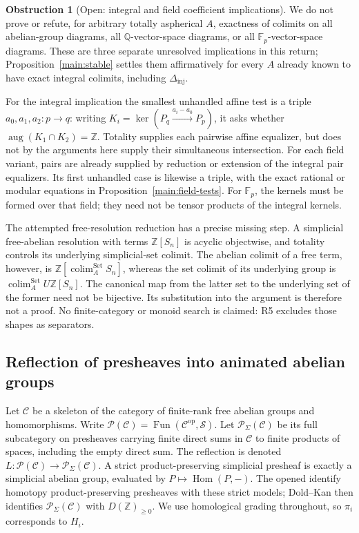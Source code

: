 \documentclass[11pt,a4paper]{article}
\theoremstyle{definition}
\newtheorem{obstruction}[theorem]{Obstruction}
\begin{document}
\begin{obstruction}[Open: integral and field coefficient implications]\label{main:stable-open}
We do not prove or refute, for arbitrary totally aspherical $A$, exactness
of colimits on all abelian-group diagrams, all $\mathbb Q$-vector-space
diagrams, or all $\mathbb F_p$-vector-space diagrams. These are three
separate unresolved implications in this return; Proposition~\ref{main:stable}
settles them affirmatively for every $A$ already known to have exact
integral colimits, including $\Delta_{\mathrm{inj}}$.

For the integral implication the smallest unhandled affine test is a
triple $a_0,a_1,a_2:p\to q$: writing
$K_i=\ker(P_q\xrightarrow{a_i-a_0}P_p)$, it asks whether
$\operatorname{aug}(K_1\cap K_2)=\mathbb Z$. Totality supplies each
pairwise affine equalizer, but does not by the arguments here supply their
simultaneous intersection. For each field variant, pairs are already supplied by reduction or extension of the integral pair equalizers. Its first unhandled case is likewise a triple, with the exact rational or modular equations in Proposition~\ref{main:field-tests}. For $\mathbb F_p$, the kernels must be formed over that field; they need not be tensor products of the integral kernels.

The attempted free-resolution reduction has a precise missing step.
A simplicial free-abelian resolution with terms $\mathbb Z[S_n]$ is
acyclic objectwise, and totality controls its underlying simplicial-set
colimit. The abelian colimit of a free term, however, is
$\mathbb Z[\operatorname{colim}^{\mathrm{Set}}_A S_n]$, whereas the set
colimit of its underlying group is
$\operatorname{colim}^{\mathrm{Set}}_A U\mathbb Z[S_n]$.
The canonical map from the latter set to the underlying set of the former
need not be bijective. Its substitution into the argument is therefore
not a proof. No finite-category or monoid search is claimed: R5 excludes
those shapes as separators.
\end{obstruction}

\subsection{Reflection of presheaves into animated abelian groups}

Let $\mathcal C$ be a skeleton of the category of finite-rank free abelian
groups and homomorphisms. Write
$\mathcal P(\mathcal C)=\operatorname{Fun}(\mathcal C^{\mathrm{op}},\mathcal S)$.
Let $\mathcal P_\Sigma(\mathcal C)$ be its full subcategory on presheaves
carrying finite direct sums in $\mathcal C$ to finite products of spaces,
including the empty direct sum. The reflection is denoted
$L:\mathcal P(\mathcal C)\to\mathcal P_\Sigma(\mathcal C)$.
A strict product-preserving simplicial presheaf is exactly a simplicial
abelian group, evaluated by $P\mapsto\operatorname{Hom}(P,-)$.
The opened \citet[Theorems 1.3 and 6.4]{Badzioch2002} identify homotopy product-preserving
presheaves with these strict models; Dold--Kan
\citep[Theorem~1.2.3.7]{LurieHA2017} then identifies
$\mathcal P_\Sigma(\mathcal C)$ with $D(\mathbb Z)_{\geq0}$.
We use homological grading throughout, so $\pi_i$ corresponds to $H_i$.
\end{document}

